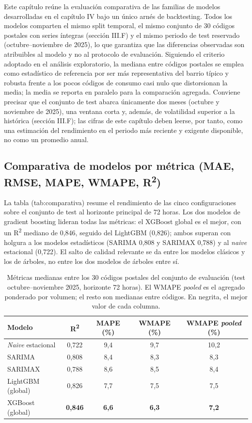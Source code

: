 \documentclass[12pt, a4paper]{article}
\begin{document}
Este capítulo reúne la evaluación comparativa de las familias de modelos desarrolladas en el capítulo IV bajo un único arnés de backtesting. Todos los modelos comparten el mismo split temporal, el mismo conjunto de 30 códigos postales con series íntegras (sección III.F) y el mismo periodo de test reservado (octubre--noviembre de 2025), lo que garantiza que las diferencias observadas son atribuibles al modelo y no al protocolo de evaluación. Siguiendo el criterio adoptado en el análisis exploratorio, la mediana entre códigos postales se emplea como estadístico de referencia por ser más representativa del barrio típico y robusta frente a los pocos códigos de consumo casi nulo que distorsionan la media; la media se reporta en paralelo para la comparación agregada. Conviene precisar que el conjunto de test abarca únicamente dos meses (octubre y noviembre de 2025), una ventana corta y, además, de volatilidad superior a la histórica (sección III.F); las cifras de este capítulo deben leerse, por tanto, como una estimación del rendimiento en el periodo más reciente y exigente disponible, no como un promedio anual.

\subsection{Comparativa de modelos por métrica (MAE, RMSE, MAPE, WMAPE, R\textsuperscript{2})}


La tabla (tab:comparativa) resume el rendimiento de las cinco configuraciones sobre el conjunto de test al horizonte principal de 72 horas. Los dos modelos de gradient boosting lideran todas las métricas: el XGBoost global es el mejor, con un R\textsuperscript{2} mediano de 0,846, seguido del LightGBM (0,826); ambos superan con holgura a los modelos estadísticos (SARIMA 0,808 y SARIMAX 0,788) y al \textit{naive} estacional (0,722). El salto de calidad relevante se da entre los modelos clásicos y los de árboles, no entre los dos modelos de árboles entre sí.


\begin{table}[htbp]
\centering
\caption{Métricas medianas entre los 30 códigos postales del conjunto de evaluación (test octubre--noviembre 2025, horizonte 72 horas). El WMAPE \textit{pooled} es el agregado ponderado por volumen; el resto son medianas entre códigos. En negrita, el mejor valor de cada columna.}
\begin{tabular}{lcccc}
\toprule
Modelo & R\textsuperscript{2} & MAPE (\%) & WMAPE (\%) & WMAPE \textit{pooled} (\%) \\
\midrule
\textit{Naive} estacional & 0,722 & 9,4 & 9,7 & 10,2 \\
SARIMA & 0,808 & 8,4 & 8,3 & 8,3 \\
SARIMAX & 0,788 & 8,6 & 8,5 & 8,4 \\
LightGBM (global) & 0,826 & 7,7 & 7,5 & 7,5 \\
XGBoost (global) & \textbf{0,846} & \textbf{6,6} & \textbf{6,3} & \textbf{7,2} \\
\bottomrule
\end{tabular}
\end{table}
\end{document}

